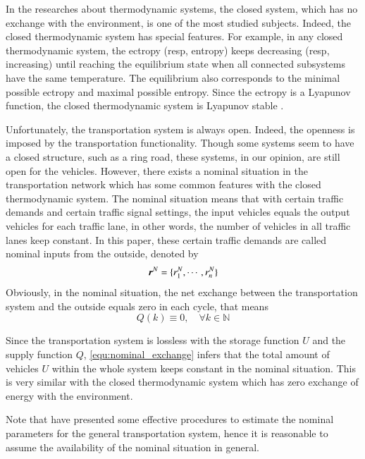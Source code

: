 \documentclass[preprint,authoryear,12pt]{elsarticle}
\renewcommand{\vec}[1]{\mbox{\boldmath$#1$}}
\begin{document}
In the researches about thermodynamic systems, the closed system,
which has no exchange with the environment, is one of the most
studied subjects. Indeed, the closed thermodynamic system has special
features. For example, in any closed thermodynamic system, the
ectropy (resp, entropy) keeps decreasing (resp, increasing) until
reaching the equilibrium state when all connected subsystems have the
same temperature. The equilibrium also corresponds to the minimal
possible ectropy and maximal possible entropy. Since the ectropy is a
Lyapunov function, the closed thermodynamic system is Lyapunov stable
\citep{haddad_thermodynamic_2005}.

Unfortunately, the transportation system is always open. Indeed, the
openness is imposed by the transportation functionality. Though some
systems seem to have a closed structure, such as a ring road, these
systems, in our opinion, are still open for the vehicles. However,
there exists a nominal situation \citep{diakaki_multivariable_2002}
in the transportation network which has some common features with the
closed thermodynamic system. The nominal situation means that with
certain traffic demands and certain traffic signal settings, the
input vehicles equals the output vehicles for each traffic lane, in
other words, the number of vehicles in all traffic lanes keep
constant. In this paper, these certain traffic demands are called
nominal inputs from the outside, denoted by
$$\vec{r}^N=\{r_1^N,\cdots,r_n^N\}$$
Obviously, in the nominal situation, the net exchange between the
transportation system and the outside equals zero in each cycle, that
means
\begin{equation}\label{equ:nominal_exchange}
Q(k)\equiv 0, \quad \forall k\in\mathbb{N}
\end{equation}

Since the transportation system is lossless with the storage function
$U$ and the supply function $Q$, \eqref{equ:nominal_exchange} infers
that the total amount of vehicles $U$ within the whole system keeps
constant in the nominal situation. This is very similar with the
closed thermodynamic system which has zero exchange of energy with
the environment.

Note that \citet{de_oliveira_multi-agent_2010} have presented some
effective procedures to estimate the nominal parameters for the
general transportation system, hence it is reasonable to assume the
availability of the nominal situation in general.
\end{document}
